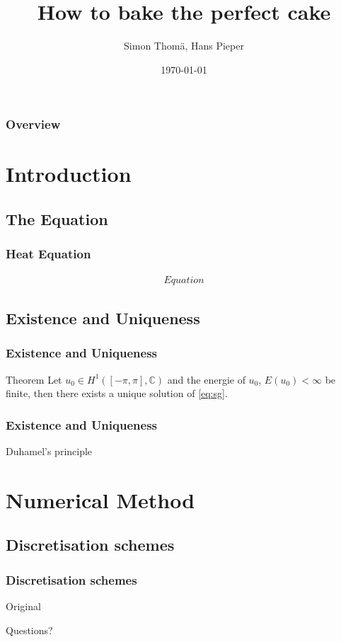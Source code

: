 \documentclass{beamer}
\title[TMA4220 - Project]{How to bake the perfect cake}
\author[Simon, Hans]{Simon Thomä, Hans Pieper}
\institute[]{
	Numerical Solution of Partial Differential Equations Using Element Methods
}
\date{\today}
\begin{document}
	\begin{frame}
		\titlepage
	\end{frame}
	
	\begin{frame}
		\frametitle{Overview}
		\tableofcontents
	\end{frame}

	\section{Introduction}
	\subsection{The Equation}
	
	\begin{frame}
		\frametitle{Heat Equation}
		\begin{block}{}
			\begin{align}
				Equation
			\end{align}
		\end{block}
	\end{frame}
	
	\subsection{Existence and Uniqueness}
	\begin{frame}
		\frametitle{Existence and Uniqueness}
		\begin{block}{Theorem}
			Let $u_0\in H^1(\left[-\pi, \pi \right],\mathbb{C})$ and the energie of $u_0$, $E(u_0)<\infty$ be finite, then there exists a unique solution of \ref{eq:sg}.
		\end{block}
	\end{frame}
	
	\begin{frame}
		\frametitle{Existence and Uniqueness}
		\begin{block}{Duhamel's principle}
		\end{block}
	\end{frame}
	
	\section{Numerical Method}
	\subsection{Discretisation schemes}
	
	\begin{frame}
		\frametitle{Discretisation schemes}
		\begin{block}{Original}
		\end{block}
	\end{frame}
	
	
	\begin{frame}
		\begin{center}
			\Large Questions?
		\end{center}
	\end{frame}
\end{document}
